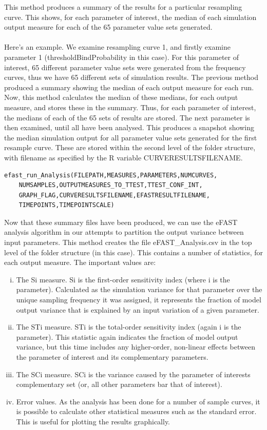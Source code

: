 \documentclass[a4paper,11pt]{article}
\begin{document}
\begin{enumerate}
This method produces a summary of the results for a particular resampling curve. This shows, for each parameter of interest, the median of each simulation output measure for each of the 65 parameter value sets generated.\\
\\
Here's an example. We examine resampling curve 1, and firstly examine parameter 1 (thresholdBindProbability in this case). For this parameter of interest, 65 different parameter value sets were generated from the frequency curves, thus we have 65 different sets of simulation results. The previous method produced a summary showing the median of each output measure for each run. Now, this method calculates the median of these medians, for each output measure, and stores these in the summary. Thus, for each parameter of interest, the medians of each of the 65 sets of results are stored. The next parameter is then examined, until all have been analysed. This produces a snapshot showing the median simulation output for all parameter value sets generated for the first resample curve. These are stored within the second level of the folder structure, with filename as specified by the R variable CURVERESULTSFILENAME.

\begin{verbatim}
efast_run_Analysis(FILEPATH,MEASURES,PARAMETERS,NUMCURVES,
	NUMSAMPLES,OUTPUTMEASURES_TO_TTEST,TTEST_CONF_INT,
	GRAPH_FLAG,CURVERESULTSFILENAME,EFASTRESULTFILENAME,
	TIMEPOINTS,TIMEPOINTSCALE)
\end{verbatim}

Now that these summary files have been produced, we can use the eFAST analysis algorithm in our attempts to partition the output variance between input parameters.  This method creates the file eFAST\_Analysis.csv in the top level of the folder structure (in this case). This contains a number of statistics, for each output measure. The important values are:
\begin{enumerate}[(i)]
\item The Si measure.  Si is the first-order sensitivity index (where i is the parameter).  Calculated as the simulation variance for that parameter over the unique sampling frequency it was assigned, it represents the fraction of model output variance that is explained by an input variation of a given parameter.
\item The STi measure. STi is the total-order sensitivity index (again i is the parameter).  This statistic again indicates the fraction of model output variance, but this time includes any higher-order, non-linear effects between the parameter of interest and its complementary parameters.
\item The SCi measure. SCi is the variance caused by the parameter of interests complementary set (or, all other parameters bar that of interest).
\item Error values.  As the analysis has been done for a number of sample curves, it is possible to calculate other statistical measures such as the standard error. This is useful for plotting the results graphically.
\end{enumerate}


\end{enumerate}
\end{document}
